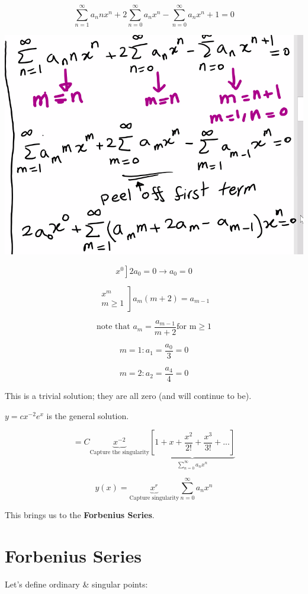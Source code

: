 $$\sum_{n = 1}^{\infty} a_n n x^n + 2 \sum_{n = 0}^{\infty} a_n x^n - \sum_{n = 0}^{\infty} a_n x^n+1 = 0$$

\includegraphics[width = 0.9 \textwidth]{image4.png}

$$\left. x^0 \right] 2 a_0 = 0 \longrightarrow a_0 = 0$$

$$ \left. \begin{matrix} x^m \\ m \geq 1 \end{matrix} \right] a_m (m+2) = a_{m-1}$$

$$\text{note that } a_m = \frac{a_{m-1}}{m+2} \text{for m} \geq 1$$

$$m = 1: a_1 = \frac{a_0}{3} = 0$$

$$m = 2: a_2 = \frac{a_4}{4} = 0$$

This is a trivial solution; they are all zero (and will continue to be). 

$y = c x^{-2} e^x$ is the general solution. 

$$ = C \underbrace{x^{-2}}_{\text{Capture the singularity}} \underbrace{\left[ 1 + x + \frac{x^2}{2!} + \frac{x^3}{3!} + ... \right]}_{\sum_{n = 0}^{\infty} a_n x^n}$$

$$ y(x) = \underbrace{x^r}_{\text{Capture singularity}} \sum_{n = 0}^{\infty} a_n x^n$$

This brings us to the \textbf{Forbenius Series}. 

\section{Forbenius Series}

Let's define ordinary \& singular points:


